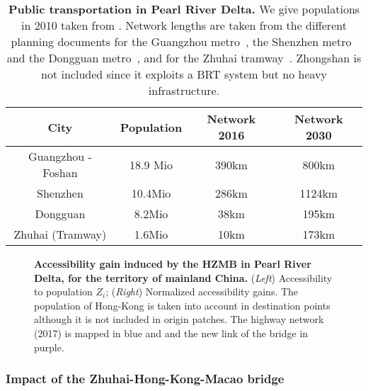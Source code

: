 \begin{table}
\caption{\textbf{Public transportation in Pearl River Delta.} We give populations in 2010 taken from \citep{yearbook2013guangdong}. Network lengths are taken from the different planning documents for the Guangzhou metro~\citep{guangzhou2016metro}, the Shenzhen metro~\citep{shenzhen2016plan} and the Dongguan metro~\citep{dongguan2017ditie}, and for the Zhuhai tramway~\citep{zhuhai2016tram}. Zhongshan is not included since it exploits a BRT system but no heavy infrastructure.\label{tab:casestudies:stats}}
\begin{center}
\begin{tabular}{|c|c|c|c|}\hline
City & Population & Network 2016 & Network 2030 \\\hline
	Guangzhou - Foshan & 18.9 Mio & 390km & 800km \\\hline
	Shenzhen & 10.4Mio & 286km & 1124km \\\hline
	Dongguan & 8.2Mio & 38km & 195km \\\hline
	Zhuhai (Tramway) & 1.6Mio & 10km & 173km \\\hline
\end{tabular}
\end{center}	
\end{table}

\begin{figure}
	\caption{\textbf{Accessibility gain induced by the HZMB in Pearl River Delta, for the territory of mainland China.} (\textit{Left}) Accessibility to population $Z_i$; (\textit{Right}) Normalized accessibility gains. The population of Hong-Kong is taken into account in destination points although it is not included in origin patches. The highway network (2017) is mapped in blue and and the new link of the bridge in purple.\label{fig:casestudies:prd}}
\end{figure}

\subsubsection{Impact of the Zhuhai-Hong-Kong-Macao bridge}

